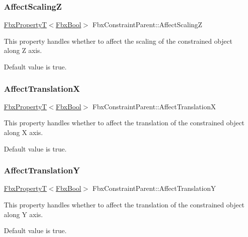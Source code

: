 \subsubsection{\texorpdfstring{Affect\+ScalingZ}{AffectScalingZ}}
{\footnotesize\ttfamily \hyperlink{class_fbx_property_t}{Fbx\+PropertyT}$<$\hyperlink{fbxtypes_8h_a92e0562b2fe33e76a242f498b362262e}{Fbx\+Bool}$>$ Fbx\+Constraint\+Parent\+::\+Affect\+ScalingZ}

This property handles whether to affect the scaling of the constrained object along Z axis.

Default value is true. \mbox{\label{class_fbx_constraint_parent_ac67f39b8f34fce85fdfba40823d243fe}} 
\subsubsection{\texorpdfstring{Affect\+TranslationX}{AffectTranslationX}}
{\footnotesize\ttfamily \hyperlink{class_fbx_property_t}{Fbx\+PropertyT}$<$\hyperlink{fbxtypes_8h_a92e0562b2fe33e76a242f498b362262e}{Fbx\+Bool}$>$ Fbx\+Constraint\+Parent\+::\+Affect\+TranslationX}

This property handles whether to affect the translation of the constrained object along X axis.

Default value is true. \mbox{\label{class_fbx_constraint_parent_a7aa3f5ad68f44254492c70e8f7201750}} 
\subsubsection{\texorpdfstring{Affect\+TranslationY}{AffectTranslationY}}
{\footnotesize\ttfamily \hyperlink{class_fbx_property_t}{Fbx\+PropertyT}$<$\hyperlink{fbxtypes_8h_a92e0562b2fe33e76a242f498b362262e}{Fbx\+Bool}$>$ Fbx\+Constraint\+Parent\+::\+Affect\+TranslationY}

This property handles whether to affect the translation of the constrained object along Y axis.

Default value is true. \mbox{\label{class_fbx_constraint_parent_ab173e3fc6e6fd0d1cfca4f3227aec6b2}} 
